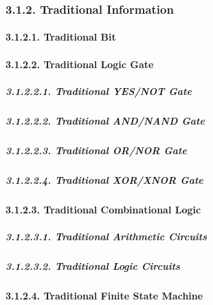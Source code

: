 \documentclass[
]{article}
\begin{document}
\hypertarget{traditional-information-1}{%
\subsubsection{3.1.2. Traditional
Information}\label{traditional-information-1}}

\hypertarget{traditional-bit-1}{%
\paragraph{3.1.2.1. Traditional Bit}\label{traditional-bit-1}}

\hypertarget{traditional-logic-gate-1}{%
\paragraph{3.1.2.2. Traditional Logic
Gate}\label{traditional-logic-gate-1}}

\hypertarget{traditional-yesnot-gate-1}{%
\subparagraph{3.1.2.2.1. Traditional YES/NOT
Gate}\label{traditional-yesnot-gate-1}}

\hypertarget{traditional-andnand-gate-1}{%
\subparagraph{3.1.2.2.2. Traditional AND/NAND
Gate}\label{traditional-andnand-gate-1}}

\hypertarget{traditional-ornor-gate-1}{%
\subparagraph{3.1.2.2.3. Traditional OR/NOR
Gate}\label{traditional-ornor-gate-1}}

\hypertarget{traditional-xorxnor-gate-1}{%
\subparagraph{3.1.2.2.4. Traditional XOR/XNOR
Gate}\label{traditional-xorxnor-gate-1}}

\hypertarget{traditional-combinational-logic-1}{%
\paragraph{3.1.2.3. Traditional Combinational
Logic}\label{traditional-combinational-logic-1}}

\hypertarget{traditional-arithmetic-circuits-1}{%
\subparagraph{3.1.2.3.1. Traditional Arithmetic
Circuits}\label{traditional-arithmetic-circuits-1}}

\hypertarget{traditional-logic-circuits-1}{%
\subparagraph{3.1.2.3.2. Traditional Logic
Circuits}\label{traditional-logic-circuits-1}}

\hypertarget{traditional-finite-state-machine-1}{%
\paragraph{3.1.2.4. Traditional Finite State
Machine}\label{traditional-finite-state-machine-1}}
\end{document}
